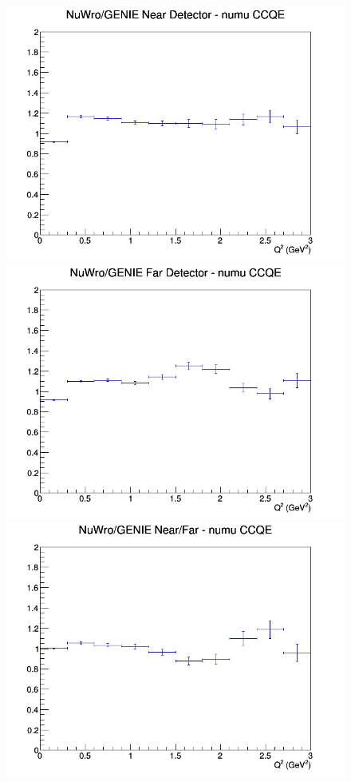 \begin{figure}[h]
\endminipage
\newline
{}
\includegraphics[width=\linewidth]{eff_Q2/FGT/ratios/CCQE_NuWro_GENIE_numu_near_Q2.png}
\endminipage
{}
\includegraphics[width=\linewidth]{eff_Q2/FGT/ratios/CCQE_NuWro_GENIE_numu_far_Q2.png}
\endminipage
{}
\includegraphics[width=\linewidth]{eff_Q2/FGT/ratios/CCQE_NuWro_GENIE_numu_NF_Q2.png}
\endminipage
\newline
\end{figure}
\clearpage
